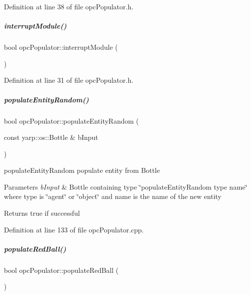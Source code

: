 Definition at line 38 of file opc\+Populator.\+h.

\mbox{\label{group__opcPopulator_a0bc208963071925c24e1c57a68f8881a}} 
\subparagraph{\texorpdfstring{interrupt\+Module()}{interruptModule()}}
{\footnotesize\ttfamily bool opc\+Populator\+::interrupt\+Module (\begin{DoxyParamCaption}{ }\end{DoxyParamCaption})\hspace{0.3cm}{\ttfamily [inline]}}



Definition at line 31 of file opc\+Populator.\+h.

\mbox{\label{group__opcPopulator_a1b284864323f5a872cdcff286c3fd9f8}} 
\subparagraph{\texorpdfstring{populate\+Entity\+Random()}{populateEntityRandom()}}
{\footnotesize\ttfamily bool opc\+Populator\+::populate\+Entity\+Random (\begin{DoxyParamCaption}\item[{const yarp\+::os\+::\+Bottle \&}]{b\+Input }\end{DoxyParamCaption})}



populate\+Entity\+Random populate entity from Bottle 


\begin{DoxyParams}{Parameters}
{\em b\+Input} & Bottle containing type \char`\"{}populate\+Entity\+Random type name\char`\"{} where type is \char`\"{}agent\char`\"{} or \char`\"{}object\char`\"{} and name is the name of the new entity \\
\hline
\end{DoxyParams}
\begin{DoxyReturn}{Returns}
true if successful 
\end{DoxyReturn}


Definition at line 133 of file opc\+Populator.\+cpp.

\mbox{\label{group__opcPopulator_ac93ef7767dd4ad2a9188c5a35372674a}} 
\subparagraph{\texorpdfstring{populate\+Red\+Ball()}{populateRedBall()}}
{\footnotesize\ttfamily bool opc\+Populator\+::populate\+Red\+Ball (\begin{DoxyParamCaption}{ }\end{DoxyParamCaption})}



